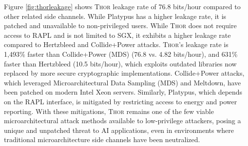 



Figure \ref{fig:thorleakage} shows \textsc{Thor} leakage rate of 76.8 bits/hour compared to other related side channels. While Platypus has a higher leakage rate, it is patched and unavailable to non-privileged users. While \textsc{Thor} does not require access to RAPL and is not limited to SGX, it exhibits a higher leakage rate compared to Hertzbleed and Collide+Power attacks.  
\textsc{Thor}'s leakage rate is {1,493\% faster than Collide+Power (MDS)} (76.8 vs. 4.82 bits/hour), and {631\% faster than Hertzbleed} (10.5 bits/hour), which exploits outdated libraries now replaced by more secure cryptographic implementations. Collide+Power attacks, which leveraged {Microarchitectural Data Sampling (MDS)} and {Meltdown}, have been patched on modern Intel Xeon servers. Similarly, Platypus, which depends on the RAPL interface, is mitigated by restricting access to energy and power reporting. With these mitigations, \textsc{Thor} remains one of the few viable microarchitectural attack methods available to low-privilege attackers, posing a unique and unpatched threat to AI applications, even in environments where traditional microarchitecture side channels have been neutralized.


